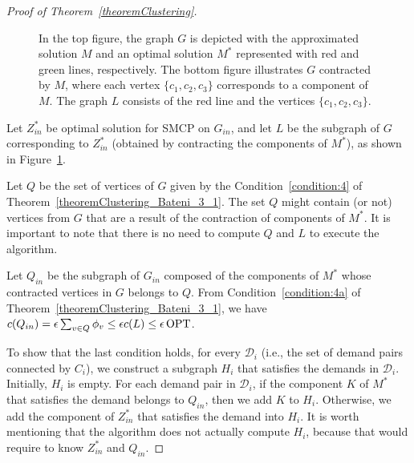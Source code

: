 \begin{proof}[Proof of Theorem~\ref{theoremClustering}]
\begin{figure}[H]

    \caption{In the top figure, the graph \(G\) is depicted with the approximated solution \(M\) and an optimal solution \(M^\ast\) represented with red and green lines, respectively. The bottom figure illustrates \(G\) contracted by \(M\), where each vertex \(\{c_1, c_2, c_3\}\) corresponds to a component of \(M\). The graph \(L\) consists of the red line and the vertices \(\{c_1, c_2, c_3\}\).}
    \label{fig:theorem_clustering_opt_contracted}
\end{figure}


Let \(Z_{in}^\ast\) be optimal solution for SMCP on \(G_{in}\), and let \(L\) be the subgraph of \(G\) corresponding to \(Z_{in}^\ast\) (obtained by contracting the components of \(M^\ast\)), as shown in Figure~\ref{fig:theorem_clustering_opt_contracted}. 

Let \(Q\) be the set of vertices of \(G\) given by the Condition~\eqref{condition:4} of Theorem~\ref{theoremClustering_Bateni_3_1}. The set \(Q\) might contain (or not) vertices from \(G\) that are a result of the contraction of components of \(M^\ast\). It is important to note that there is no need to compute \(Q\) and \(L\) to execute the algorithm. 

Let \(Q_{in}\) be the subgraph of \(G_{in}\) composed of the components of \(M^\ast\) whose contracted vertices in \(G\) belongs to \(Q\). From Condition~\eqref{condition:4a} of Theorem~\ref{theoremClustering_Bateni_3_1}, we have \(c(Q_{in}) = \epsilon \sum_{v \in Q} \phi_v \leq \epsilon c (L) \leq \epsilon \operatorname{\textrm{OPT}}\).

To show that the last condition holds, for every \(\mathcal{D}_i\) (i.e., the set of demand pairs connected by \(C_i\)), we construct a subgraph \(H_i\) that satisfies the demands in \(\mathcal{D}_i\). Initially, \(H_i\) is empty. For each demand pair in \(\mathcal{D}_i\), if the component \(K\) of \(M^\ast\) that satisfies the demand belongs to \(Q_{in}\), then we add \(K\) to \(H_i\). Otherwise, we add the component of \(Z_{in}^\ast\) that satisfies the demand into \(H_i\). It is worth mentioning that the algorithm does not actually compute \(H_i\), because that would require to know \(Z_{in}^\ast\) and \(Q_{in}\).


\end{proof}
